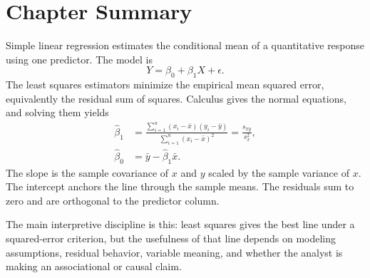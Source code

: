 \section{Chapter Summary}

Simple linear regression estimates the conditional mean of a quantitative response using one predictor.  The model is
\begin{equation}
  Y=\beta_0+\beta_1X+\epsilon.
\end{equation}
The least squares estimators minimize the empirical mean squared error, equivalently the residual sum of squares.  Calculus gives the normal equations, and solving them yields
\begin{align}
  \widehat{\beta}_1&=\frac{\sum_{i=1}^n(x_i-\bar{x})(y_i-\bar{y})}{\sum_{i=1}^n(x_i-\bar{x})^2}
  =\frac{s_{xy}}{s_x^2}, \\
  \widehat{\beta}_0&=\bar{y}-\widehat{\beta}_1\bar{x}.
\end{align}
The slope is the sample covariance of $x$ and $y$ scaled by the sample variance of $x$.  The intercept anchors the line through the sample means.  The residuals sum to zero and are orthogonal to the predictor column.

The main interpretive discipline is this: least squares gives the best line under a squared-error criterion, but the usefulness of that line depends on modeling assumptions, residual behavior, variable meaning, and whether the analyst is making an associational or causal claim.

